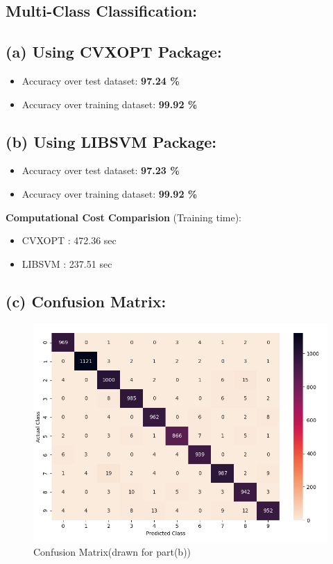 \documentclass[a4 paper]{article}
\begin{document}
\subsection{Multi-Class Classification:}
\vspace*{4mm}
\subsection*{(a) Using CVXOPT Package:}
	\begin{itemize}
	\item Accuracy over test dataset: \textbf{97.24 \%}
	\item Accuracy over training dataset: \textbf{99.92 \%}
	\end{itemize}

\subsection*{(b) Using LIBSVM Package:}
	\begin{itemize}
	\item Accuracy over test dataset: \textbf{97.23 \%}
	\item Accuracy over training dataset: \textbf{99.92 \%}
	\end{itemize}

\textbf{Computational Cost Comparision }(Training time):
\begin{itemize}
\item CVXOPT : 472.36 sec
\item LIBSVM : 237.51 sec
\end{itemize}

\subsection*{(c) Confusion Matrix:}

	\begin{figure}[H]
		\centering %
		\includegraphics[width=150mm]{extra/2c.png}
		\caption{Confusion Matrix(drawn for part(b))\label{MIMD}}
	\end{figure}
\end{document}
